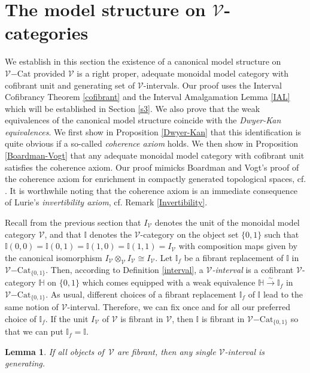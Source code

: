 \documentclass[10pt]{amsart}
\theoremstyle{plain}
\newtheorem{lma}[subsection]{Lemma}
\theoremstyle{remark}
\def\Vv{\mathcal{V}}
\def\Cat{\mathrm{Cat}}
\def\VCat{\Vv\mathrm{-}\Cat}
\def\Iso{\mathbb{I}}
\def\wIso{\Iso_f}
\def\eqv{\overset\sim\lrto}
\def\HH{\mathbb{H}}
\def\lrto{\longrightarrow}
\begin{document}
\section{The model structure on $\Vv$-categories}\label{s2}

We establish in this section the existence of a canonical model structure on $\VCat$ provided $\Vv$ is a right proper, adequate monoidal model category with cofibrant unit and generating set of $\Vv$-intervals. Our proof uses the Interval Cofibrancy Theorem \ref{cofibrant} and the Interval Amalgamation Lemma \ref{IAL} which will be established in Section \ref{s3}. We also prove that the weak equivalences of the canonical model structure coincide with the \emph{Dwyer-Kan equivalences}. We first show in Proposition \ref{Dwyer-Kan} that this identification is quite obvious if a so-called \emph{coherence axiom} holds. We then show in Proposition \ref{Boardman-Vogt} that any adequate monoidal model category with cofibrant unit satisfies the coherence axiom. Our proof mimicks Boardman and Vogt's proof of the coherence axiom for enrichment in compactly generated topological spaces, cf. \cite[Lemma 4.16]{BV}. It is worthwhile noting that the coherence axiom is an immediate consequence of Lurie's \emph{invertibility axiom}, cf. Remark \ref{Invertibility}.\vspace{1ex}

Recall from the previous section that $I_\Vv$ denotes the unit of the monoidal model category $\Vv$, and that $\Iso$ denotes the $\Vv$-category on the object set $\{0,1\}$ such that $\Iso(0,0)=\Iso(0,1)=\Iso(1,0)=\Iso(1,1)=I_\Vv$ with composition maps given by the canonical isomorphism $I_\Vv\otimes_\Vv I_\Vv\cong I_\Vv$. Let $\wIso$ be a fibrant replacement of $\Iso$ in $\VCat_{\{0,1\}}$. Then, according to Definition \ref{interval}, a \emph{$\Vv$-interval} is a cofibrant $\Vv$-category $\HH$ on $\{0,1\}$ which comes equipped with a weak equivalence $\HH\eqv\wIso$ in $\VCat_{\{0,1\}}$. As usual, different choices of a fibrant replacement $\wIso$ of $\Iso$ lead to the same notion of $\Vv$-interval. Therefore, we can fix once and for all our preferred choice of $\wIso$. If the unit $I_\Vv$ of $\Vv$ is fibrant in $\Vv$, then $\Iso$ is fibrant in $\VCat_{\{0,1\}}$ so that we can put $\wIso=\Iso$.

\begin{lma}\label{single}If all objects of $\,\Vv$ are fibrant, then any single $\Vv$-interval is generating.\end{lma}
\end{document}
